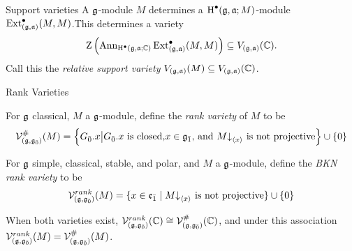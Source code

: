 \documentclass{beamer}
\begin{document}
\begin{frame}{Support varieties}\pause
  A $\mathfrak{g}$-module $M$ determines a $\operatorname{H}^\bullet(\mathfrak{g},\mathfrak{a};M)$-module $\operatorname{Ext}^\bullet_{(\mathfrak{g},\mathfrak{a})}(M,M)$.\pause This determines a variety
  \[
    \operatorname{Z}\left(\operatorname{Ann}_{\operatorname{H}^\bullet(\mathfrak{g},\mathfrak{a};\mathbb{C})}\operatorname{Ext}^\bullet_{(\mathfrak{g},\mathfrak{a})}(M,M)\right) \subseteq V_{(\mathfrak{g},\mathfrak{a})}(\mathbb{C}).
  \]\pause
  Call this the \emph{relative support variety} $V_{(\mathfrak{g},\mathfrak{a})}(M) \subseteq V_{(\mathfrak{g},\mathfrak{a})}(\mathbb{C})$.
\end{frame}

\begin{frame}{Rank Varieties}\pause
  \begin{definition}
    For $\mathfrak{g}$ classical, $M$ a $\mathfrak{g}$-module, define the \emph{rank variety} of $M$ to be
    \[
      \mathcal{V}_{(\mathfrak{g},{\mathfrak{g}}_{\bar{0}})}^\#(M) = \left\{{G}_{\bar{0}}.x \big| {G}_{\bar{0}}.x \text{ is closed,} x \in {\mathfrak{g}}_{\bar{1}}\text{, and } M\mathord{\downarrow}_{\left<x\right>} \text{ is not projective} \right\} \cup \{ 0\}
    \]
  \end{definition}\pause
  \begin{definition}
    For $\mathfrak{g}$ simple, classical, stable, and polar, and $M$ a $\mathfrak{g}$-module, define the \emph{BKN rank variety} to be
    \[
      \mathcal{V}_{(\mathfrak{g},{\mathfrak{g}}_{\bar{0}})}^{rank}(M) = \{x \in {\mathfrak{e}}_{\bar{1}} \mid M \mathord{\downarrow}_{\left<x\right>} \text{ is not projective}\} \cup \{0\}
    \]    
  \end{definition}\pause
  \begin{conjecture}
    When both varieties exist, $\mathcal{V}_{(\mathfrak{g},{\mathfrak{g}}_{\bar{0}})}^{rank}(\mathbb{C}) \cong \mathcal{V}_{(\mathfrak{g},{\mathfrak{g}}_{\bar{0}})}^\#(\mathbb{C})$, and under this association $\mathcal{V}_{(\mathfrak{g},{\mathfrak{g}}_{\bar{0}})}^{rank}(M) = \mathcal{V}_{(\mathfrak{g},{\mathfrak{g}}_{\bar{0}})}^\#(M)$.
  \end{conjecture}
\end{frame}

  
\end{document}
